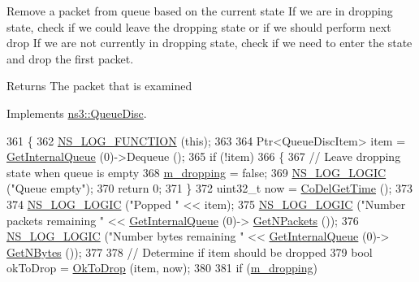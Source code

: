 Remove a packet from queue based on the current state If we are in dropping state, check if we could leave the dropping state or if we should perform next drop If we are not currently in dropping state, check if we need to enter the state and drop the first packet. 

\begin{DoxyReturn}{Returns}
The packet that is examined 
\end{DoxyReturn}


Implements \hyperlink{classns3_1_1QueueDisc_afefae1a05f45db101c2c75d67a440c63}{ns3\+::\+Queue\+Disc}.


\begin{DoxyCode}
361 \{
362   \hyperlink{log-macros-disabled_8h_a90b90d5bad1f39cb1b64923ea94c0761}{NS\_LOG\_FUNCTION} (\textcolor{keyword}{this});
363 
364   Ptr<QueueDiscItem> item = \hyperlink{classns3_1_1QueueDisc_adf09b498c07c5677c26ea4b8309def74}{GetInternalQueue} (0)->Dequeue ();
365   \textcolor{keywordflow}{if} (!item)
366     \{
367       \textcolor{comment}{// Leave dropping state when queue is empty}
368       \hyperlink{classns3_1_1CoDelQueueDisc_ae6b02968204bd5c2e6d68e532ce679c4}{m\_dropping} = \textcolor{keyword}{false};
369       \hyperlink{group__logging_ga88acd260151caf2db9c0fc84997f45ce}{NS\_LOG\_LOGIC} (\textcolor{stringliteral}{"Queue empty"});
370       \textcolor{keywordflow}{return} 0;
371     \}
372   uint32\_t now = \hyperlink{namespacens3_affec668ac26bd382b1e7b79a30a192de}{CoDelGetTime} ();
373 
374   \hyperlink{group__logging_ga88acd260151caf2db9c0fc84997f45ce}{NS\_LOG\_LOGIC} (\textcolor{stringliteral}{"Popped "} << item);
375   \hyperlink{group__logging_ga88acd260151caf2db9c0fc84997f45ce}{NS\_LOG\_LOGIC} (\textcolor{stringliteral}{"Number packets remaining "} << \hyperlink{classns3_1_1QueueDisc_adf09b498c07c5677c26ea4b8309def74}{GetInternalQueue} (0)->
      \hyperlink{classns3_1_1QueueDisc_a6ee992f32c1671512f0948fd6cc46a7e}{GetNPackets} ());
376   \hyperlink{group__logging_ga88acd260151caf2db9c0fc84997f45ce}{NS\_LOG\_LOGIC} (\textcolor{stringliteral}{"Number bytes remaining "} << \hyperlink{classns3_1_1QueueDisc_adf09b498c07c5677c26ea4b8309def74}{GetInternalQueue} (0)->
      \hyperlink{classns3_1_1QueueDisc_ac87d3bbf7381d64808f6764bdfd812e5}{GetNBytes} ());
377 
378   \textcolor{comment}{// Determine if item should be dropped}
379   \textcolor{keywordtype}{bool} okToDrop = \hyperlink{classns3_1_1CoDelQueueDisc_a9b3e4ad53210fe2b1098fc799e139ff0}{OkToDrop} (item, now);
380 
381   \textcolor{keywordflow}{if} (\hyperlink{classns3_1_1CoDelQueueDisc_ae6b02968204bd5c2e6d68e532ce679c4}{m\_dropping})

\end{DoxyCode}
